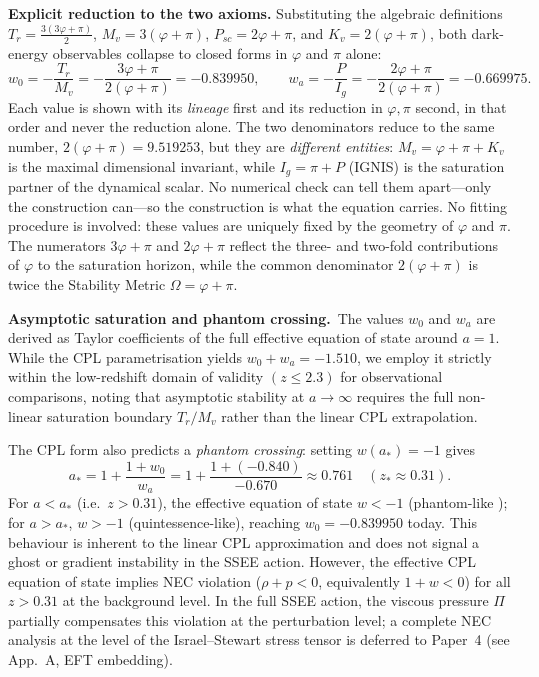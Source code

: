 \documentclass[12pt,a4paper]{article}
\newcommand{\wz}{w_0}
\newcommand{\wa}{w_a}
\begin{document}
\noindent\textbf{Explicit reduction to the two axioms.}
Substituting the algebraic definitions
$T_r = \tfrac{3(3\varphi+\pi)}{2}$,
$M_v = 3(\varphi+\pi)$,
$P_{sc} = 2\varphi+\pi$, and
$K_v = 2(\varphi+\pi)$, both
dark-energy observables collapse to closed forms in $\varphi$ and $\pi$ alone:
\begin{equation}
  \boxed{w_0 = -\frac{T_r}{M_v} = -\frac{3\varphi+\pi}{2(\varphi+\pi)} = -0.839950},
  \qquad
  \boxed{w_a = -\frac{P}{I_g} = -\frac{2\varphi+\pi}{2(\varphi+\pi)} = -0.669975}.
  \label{eq:w0wa_explicit}
\end{equation}
Each value is shown with its \emph{lineage} first and its reduction in
$\varphi,\pi$ second, in that order and never the reduction alone. The two
denominators reduce to the same number, $2(\varphi+\pi)=9.519253$, but they are
\emph{different entities}: $M_v=\varphi+\pi+K_v$ is the maximal dimensional
invariant, while $I_g=\pi+P$ (IGNIS) is the saturation partner of the dynamical
scalar. No numerical check can tell them apart---only the construction can---so
the construction is what the equation carries.
No fitting procedure is involved: these values are uniquely fixed by the geometry of $\varphi$ and $\pi$.
The numerators $3\varphi+\pi$ and $2\varphi+\pi$ reflect the three- and two-fold
contributions of $\varphi$ to the saturation horizon, while the common denominator
$2(\varphi+\pi)$ is twice the Stability Metric $\Omega=\varphi+\pi$.

\medskip
\noindent\textbf{Asymptotic saturation and phantom crossing.}\ The values $w_0$ and $w_a$ are derived as Taylor coefficients of the full effective equation of state around $a=1$. While the CPL parametrisation yields $w_0+w_a=-1.510$, we employ it strictly within the low-redshift domain of validity $(z \le 2.3)$ for observational comparisons, noting that asymptotic stability at $a \to \infty$ requires the full non-linear saturation boundary $T_r/M_v$ rather than the linear CPL extrapolation.

The CPL form also predicts a \emph{phantom crossing}: setting $w(a_*)=-1$ gives
\begin{equation}
  a_* = 1 + \frac{1+\wz}{\wa} = 1 + \frac{1+(-0.840)}{-0.670} \approx 0.761
  \quad (z_* \approx 0.31).
  \label{eq:phantom_crossing}
\end{equation}
For $a < a_*$ (i.e.\ $z > 0.31$), the effective equation of state $w < -1$
(phantom-like \citep{Caldwell2002}); for $a > a_*$, $w > -1$ (quintessence-like),
reaching $w_0=-0.839950$ today.  This behaviour is inherent to the linear CPL
approximation and does not signal a ghost or gradient instability in the SSEE action.
However, the effective CPL equation of state implies NEC violation
($\rho + p < 0$, equivalently $1 + w < 0$) for all $z > 0.31$ at the background
level.  In the full SSEE action, the viscous pressure $\Pi$ partially compensates
this violation at the perturbation level; a complete NEC analysis at the level of
the Israel--Stewart stress tensor \citep{Israel1976,IsraelStewart1979} is deferred to Paper~4 (see App.~A, EFT embedding).
\end{document}
